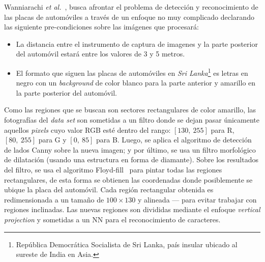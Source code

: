 Wanniarachi \textit{et al.}~\cite{Wanniarachchi:2007:LPIbasedIPT}, busca
afrontar el problema de detección y reconocimiento de las placas de automóviles
a través de un enfoque no muy complicado declarando las siguiente
pre-condiciones sobre las imágenes que procesará:
\begin{itemize}
	\item La distancia entre el instrumento de captura de imagenes y la parte
posterior del automóvil estará entre los valores de 3 y 5 metros.
	\item El formato que siguen las placas de automóviles en \textit{Sri
Lanka}\footnote{República Democrática Socialista de Sri Lanka, país insular
ubicado al sureste de India en Asia.} es letras en negro con un
\textit{background} de color blanco para la parte anterior y amarillo en la
parte posterior del automóvil.
\end{itemize}

Como las regiones que se buscan son sectores rectangulares de color amarillo,
las fotografías del \textit{data set} son sometidas a un filtro donde se dejan
pasar únicamente aquellos \textit{pixels} cuyo valor RGB esté dentro del rango:
$[130, ~255 ]$ para R, $[80, ~255 ]$ para G y $[0, ~85 ]$ para B. Luego, se
aplica el algoritmo  de detección de lados Canny sobre la nueva imagen; y por
último, se usa un filtro morfológico de dilatación (usando una estructura en
forma de diamante). Sobre los resultados del filtro, se usa el algoritmo
Floyd-fill~\cite{Floyd:web} para pintar todas las regiones rectangulares, de
esta forma se obtienen las coordenadas donde posiblemente se ubique la placa del
automóvil. Cada región rectangular obtenida es redimensionada a un tamaño de
$100 \times 130$ y alineada --- para evitar trabajar con regiones inclinadas.
Las nuevas regiones son divididas mediante el enfoque \textit{vertical
projection} y sometidas a un NN para el reconocimiento de caracteres.

